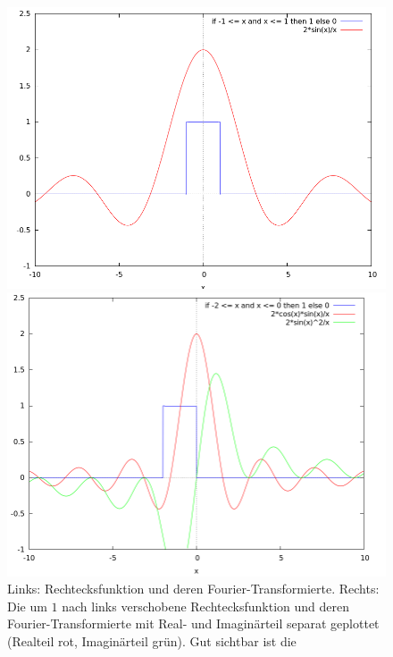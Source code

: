 \begin{remark}
\begin{description}
  \begin{figure}[ht]
      \centering
      \begin{minipage}{0.49\linewidth}
        \centering
        \includegraphics[width=\linewidth]{Bilder/Rechteck1}
      \end{minipage}
      \begin{minipage}{0.49\linewidth}
        \centering
        \includegraphics[width=\linewidth]{Bilder/Rechteck2}
      \end{minipage}
      \caption{Links: Rechtecksfunktion und deren Fourier-Transformierte. Rechts: Die um $ 1 $
        nach links verschobene Rechtecksfunktion und deren Fourier-Transformierte mit Real- und 
        Imaginärteil separat geplottet (Realteil rot, Imaginärteil grün). Gut sichtbar ist die 
}
\end{figure}
\end{description}
\end{remark}

